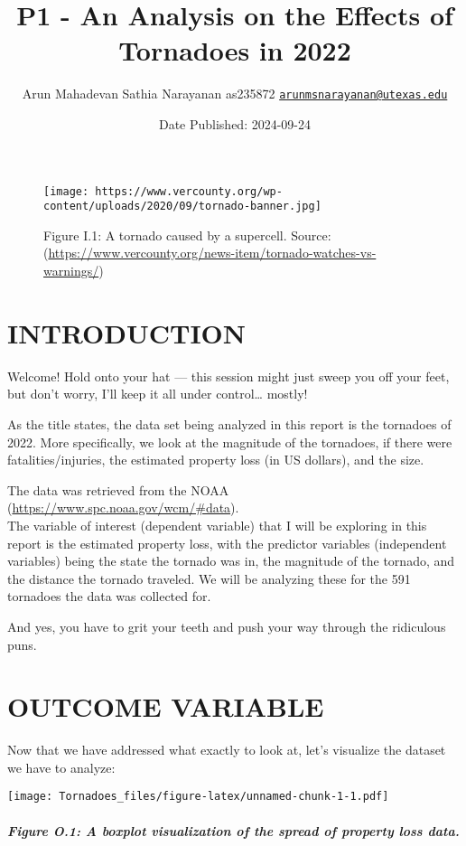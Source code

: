 \documentclass[
]{article}
\title{P1 - An Analysis on the Effects of Tornadoes in 2022}
\author{Arun Mahadevan Sathia Narayanan \textbar{} as235872 \textbar{}
\href{mailto:arunmsnarayanan@utexas.edu}{\nolinkurl{arunmsnarayanan@utexas.edu}}}
\date{Date Published: 2024-09-24}
\begin{document}
\maketitle

{
\setcounter{tocdepth}{2}
\tableofcontents
}
\begin{figure}
\centering
\texttt{[image: https://www.vercounty.org/wp-content/uploads/2020/09/tornado-banner.jpg]}
\caption{Figure I.1: A tornado caused by a supercell. Source:
(\url{https://www.vercounty.org/news-item/tornado-watches-vs-warnings/})}
\end{figure}

\section{INTRODUCTION}\label{introduction}

Welcome! Hold onto your hat --- this session might just sweep you off
your feet, but don't worry, I'll keep it all under control\ldots{}
mostly!

As the title states, the data set being analyzed in this report is the
tornadoes of 2022. More specifically, we look at the magnitude of the
tornadoes, if there were fatalities/injuries, the estimated property
loss (in US dollars), and the size.

The data was retrieved from the NOAA
(\url{https://www.spc.noaa.gov/wcm/\#data}).\\
The variable of interest (dependent variable) that I will be exploring
in this report is the estimated property loss, with the predictor
variables (independent variables) being the state the tornado was in,
the magnitude of the tornado, and the distance the tornado traveled. We
will be analyzing these for the 591 tornadoes the data was collected
for.

And yes, you have to grit your teeth and push your way through the
ridiculous puns.

\section{OUTCOME VARIABLE}\label{outcome-variable}

Now that we have addressed what exactly to look at, let's visualize the
dataset we have to analyze:

\texttt{[image: Tornadoes\_files/figure-latex/unnamed-chunk-1-1.pdf]}

\subparagraph{Figure O.1: A boxplot visualization of the spread of
property loss
data.}\label{figure-o.1-a-boxplot-visualization-of-the-spread-of-property-loss-data.}
\end{document}

